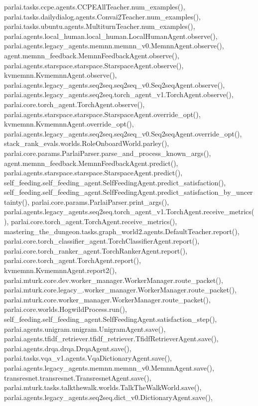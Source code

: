 parlai.\+tasks.\+ccpe.\+agents.\+C\+C\+P\+E\+All\+Teacher.\+num\+\_\+examples(), parlai.\+tasks.\+dailydialog.\+agents.\+Convai2\+Teacher.\+num\+\_\+examples(), parlai.\+tasks.\+ubuntu.\+agents.\+Multiturn\+Teacher.\+num\+\_\+examples(), parlai.\+agents.\+local\+\_\+human.\+local\+\_\+human.\+Local\+Human\+Agent.\+observe(), parlai.\+agents.\+legacy\+\_\+agents.\+memnn.\+memnn\+\_\+v0.\+Memnn\+Agent.\+observe(), agent.\+memnn\+\_\+feedback.\+Memnn\+Feedback\+Agent.\+observe(), parlai.\+agents.\+starspace.\+starspace.\+Starspace\+Agent.\+observe(), kvmemnn.\+Kvmemnn\+Agent.\+observe(), parlai.\+agents.\+legacy\+\_\+agents.\+seq2seq.\+seq2seq\+\_\+v0.\+Seq2seq\+Agent.\+observe(), parlai.\+agents.\+legacy\+\_\+agents.\+seq2seq.\+torch\+\_\+agent\+\_\+v1.\+Torch\+Agent.\+observe(), parlai.\+core.\+torch\+\_\+agent.\+Torch\+Agent.\+observe(), parlai.\+agents.\+starspace.\+starspace.\+Starspace\+Agent.\+override\+\_\+opt(), kvmemnn.\+Kvmemnn\+Agent.\+override\+\_\+opt(), parlai.\+agents.\+legacy\+\_\+agents.\+seq2seq.\+seq2seq\+\_\+v0.\+Seq2seq\+Agent.\+override\+\_\+opt(), stack\+\_\+rank\+\_\+evals.\+worlds.\+Role\+Onboard\+World.\+parley(), parlai.\+core.\+params.\+Parlai\+Parser.\+parse\+\_\+and\+\_\+process\+\_\+known\+\_\+args(), agent.\+memnn\+\_\+feedback.\+Memnn\+Feedback\+Agent.\+predict(), parlai.\+agents.\+starspace.\+starspace.\+Starspace\+Agent.\+predict(), self\+\_\+feeding.\+self\+\_\+feeding\+\_\+agent.\+Self\+Feeding\+Agent.\+predict\+\_\+satisfaction(), self\+\_\+feeding.\+self\+\_\+feeding\+\_\+agent.\+Self\+Feeding\+Agent.\+predict\+\_\+satisfaction\+\_\+by\+\_\+uncertainty(), parlai.\+core.\+params.\+Parlai\+Parser.\+print\+\_\+args(), parlai.\+agents.\+legacy\+\_\+agents.\+seq2seq.\+torch\+\_\+agent\+\_\+v1.\+Torch\+Agent.\+receive\+\_\+metrics(), parlai.\+core.\+torch\+\_\+agent.\+Torch\+Agent.\+receive\+\_\+metrics(), mastering\+\_\+the\+\_\+dungeon.\+tasks.\+graph\+\_\+world2.\+agents.\+Default\+Teacher.\+report(), parlai.\+core.\+torch\+\_\+classifier\+\_\+agent.\+Torch\+Classifier\+Agent.\+report(), parlai.\+core.\+torch\+\_\+ranker\+\_\+agent.\+Torch\+Ranker\+Agent.\+report(), parlai.\+core.\+torch\+\_\+agent.\+Torch\+Agent.\+report(), kvmemnn.\+Kvmemnn\+Agent.\+report2(), parlai.\+mturk.\+core.\+dev.\+worker\+\_\+manager.\+Worker\+Manager.\+route\+\_\+packet(), parlai.\+mturk.\+core.\+legacy\+\_.\+worker\+\_\+manager.\+Worker\+Manager.\+route\+\_\+packet(), parlai.\+mturk.\+core.\+worker\+\_\+manager.\+Worker\+Manager.\+route\+\_\+packet(), parlai.\+core.\+worlds.\+Hogwild\+Process.\+run(), self\+\_\+feeding.\+self\+\_\+feeding\+\_\+agent.\+Self\+Feeding\+Agent.\+satisfaction\+\_\+step(), parlai.\+agents.\+unigram.\+unigram.\+Unigram\+Agent.\+save(), parlai.\+agents.\+tfidf\+\_\+retriever.\+tfidf\+\_\+retriever.\+Tfidf\+Retriever\+Agent.\+save(), parlai.\+agents.\+drqa.\+drqa.\+Drqa\+Agent.\+save(), parlai.\+tasks.\+vqa\+\_\+v1.\+agents.\+Vqa\+Dictionary\+Agent.\+save(), parlai.\+agents.\+legacy\+\_\+agents.\+memnn.\+memnn\+\_\+v0.\+Memnn\+Agent.\+save(), transresnet.\+transresnet.\+Transresnet\+Agent.\+save(), parlai.\+mturk.\+tasks.\+talkthewalk.\+worlds.\+Talk\+The\+Walk\+World.\+save(), parlai.\+agents.\+legacy\+\_\+agents.\+seq2seq.\+dict\+\_\+v0.\+Dictionary\+Agent.\+save(), 